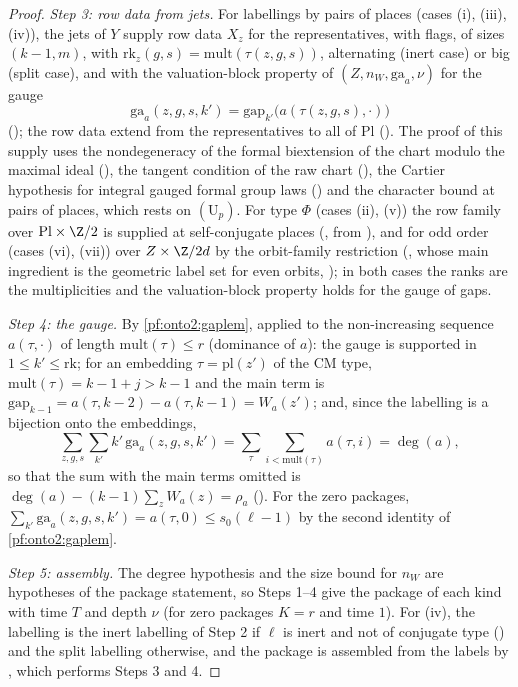 \begin{proof}
\emph{Step 3: row data from jets.} For labellings by pairs of places (cases (i), (iii), (iv)), the jets of $Y$ supply row data
$X_z$ for the representatives, with flags, of sizes $(k-1,m)$, with $\mathrm{rk}_z(g,s)=\mathrm{mult}(\tau(z,g,s))$, alternating (inert
case) or big (split case), and with the valuation-block property of $(Z,n_W,\mathrm{ga}_a,\nu)$ for the gauge
\[
\mathrm{ga}_a(z,g,s,k')=\mathrm{gap}_{k'}\bigl(a(\tau(z,g,s),\cdot)\bigr)
\]
(); the row data extend from the representatives to all of
$\mathrm{Pl}$ (). The proof of this supply uses the nondegeneracy of the formal
biextension of the chart modulo the maximal ideal (),
the tangent condition of the raw chart (), the Cartier
hypothesis for integral gauged formal group laws () and the
character bound at pairs of places, which rests on $(\mathrm U_p)$. For type $\Phi$ (cases (ii), (v)) the row family over
$\mathrm{Pl}\times\Z/2$ is supplied at self-conjugate places (, from
), and for odd order (cases (vi), (vii)) over $Z\times\Z/2d$ by the
orbit-family restriction (, whose main ingredient is the geometric
label set for even orbits, ); in both cases the ranks are the
multiplicities and the valuation-block property holds for the gauge of gaps.

\emph{Step 4: the gauge.} By \cref{pf:onto2:gaplem}, applied to the non-increasing sequence $a(\tau,\cdot)$ of length
$\mathrm{mult}(\tau)\le r$ (dominance of $a$): the gauge is supported in $1\le k'\le\mathrm{rk}$; for an embedding $\tau=\mathrm{pl}(z')$ of
the CM type, $\mathrm{mult}(\tau)=k-1+j>k-1$ and the main term is $\mathrm{gap}_{k-1}=a(\tau,k-2)-a(\tau,k-1)=W_a(z')$; and, since the
labelling is a bijection onto the embeddings,
\[
\sum_{z,g,s}\sum_{k'}k'\,\mathrm{ga}_a(z,g,s,k')=\sum_\tau\sum_{i<\mathrm{mult}(\tau)}a(\tau,i)=\deg(a),
\]
so that the sum with the main terms omitted is $\deg(a)-(k-1)\sum_zW_a(z)=\rho_a$ (). For the
zero packages, $\sum_{k'}\mathrm{ga}_a(z,g,s,k')=a(\tau,0)\le s_0(\ell-1)$ by the second identity of \cref{pf:onto2:gaplem}.

\emph{Step 5: assembly.} The degree hypothesis and the size bound for $n_W$ are hypotheses of the package statement, so Steps 1--4
give the package of each kind with time $T$ and depth $\nu$ (for zero packages $K=r$ and time $1$). For (iv), the labelling is the
inert labelling of Step 2 if $\ell$ is inert and not of conjugate type
() and the split labelling otherwise, and the package is
assembled from the labels by , which performs Steps 3 and 4.
\end{proof}

